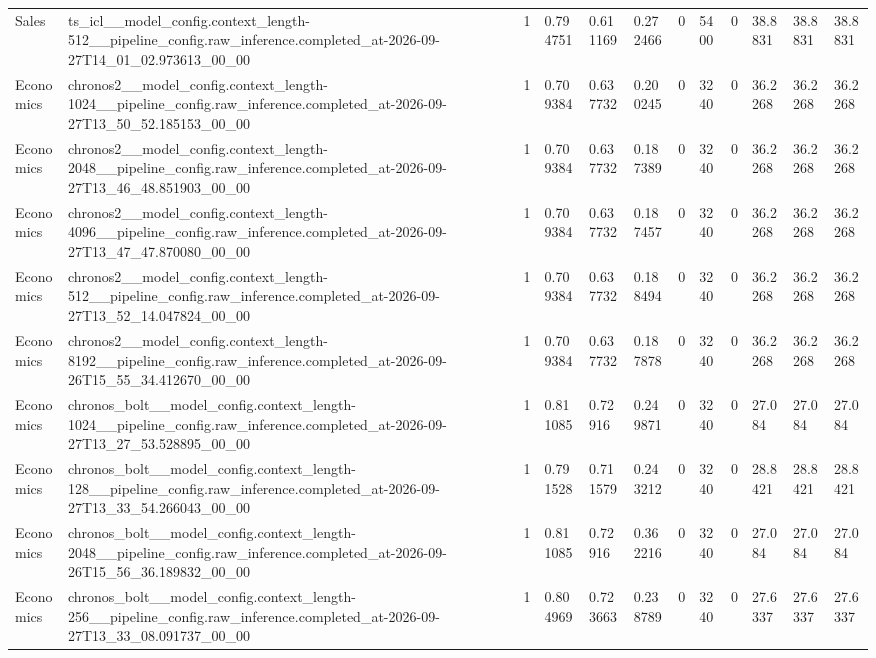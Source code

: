 \begin{tabular}{llllllllllll}
Sales & ts\_icl\_\_model\_config.context\_length-512\_\_pipeline\_config.raw\_inference.completed\_at-2026-09-27T14\_01\_02.973613\_00\_00 & 1 & 0.794751 & 0.611169 & 0.272466 & 0 & 5400 & 0 & 38.8831 & 38.8831 & 38.8831 \\
Economics & chronos2\_\_model\_config.context\_length-1024\_\_pipeline\_config.raw\_inference.completed\_at-2026-09-27T13\_50\_52.185153\_00\_00 & 1 & 0.709384 & 0.637732 & 0.200245 & 0 & 3240 & 0 & 36.2268 & 36.2268 & 36.2268 \\
Economics & chronos2\_\_model\_config.context\_length-2048\_\_pipeline\_config.raw\_inference.completed\_at-2026-09-27T13\_46\_48.851903\_00\_00 & 1 & 0.709384 & 0.637732 & 0.187389 & 0 & 3240 & 0 & 36.2268 & 36.2268 & 36.2268 \\
Economics & chronos2\_\_model\_config.context\_length-4096\_\_pipeline\_config.raw\_inference.completed\_at-2026-09-27T13\_47\_47.870080\_00\_00 & 1 & 0.709384 & 0.637732 & 0.187457 & 0 & 3240 & 0 & 36.2268 & 36.2268 & 36.2268 \\
Economics & chronos2\_\_model\_config.context\_length-512\_\_pipeline\_config.raw\_inference.completed\_at-2026-09-27T13\_52\_14.047824\_00\_00 & 1 & 0.709384 & 0.637732 & 0.188494 & 0 & 3240 & 0 & 36.2268 & 36.2268 & 36.2268 \\
Economics & chronos2\_\_model\_config.context\_length-8192\_\_pipeline\_config.raw\_inference.completed\_at-2026-09-26T15\_55\_34.412670\_00\_00 & 1 & 0.709384 & 0.637732 & 0.187878 & 0 & 3240 & 0 & 36.2268 & 36.2268 & 36.2268 \\
Economics & chronos\_bolt\_\_model\_config.context\_length-1024\_\_pipeline\_config.raw\_inference.completed\_at-2026-09-27T13\_27\_53.528895\_00\_00 & 1 & 0.811085 & 0.72916 & 0.249871 & 0 & 3240 & 0 & 27.084 & 27.084 & 27.084 \\
Economics & chronos\_bolt\_\_model\_config.context\_length-128\_\_pipeline\_config.raw\_inference.completed\_at-2026-09-27T13\_33\_54.266043\_00\_00 & 1 & 0.791528 & 0.711579 & 0.243212 & 0 & 3240 & 0 & 28.8421 & 28.8421 & 28.8421 \\
Economics & chronos\_bolt\_\_model\_config.context\_length-2048\_\_pipeline\_config.raw\_inference.completed\_at-2026-09-26T15\_56\_36.189832\_00\_00 & 1 & 0.811085 & 0.72916 & 0.362216 & 0 & 3240 & 0 & 27.084 & 27.084 & 27.084 \\
Economics & chronos\_bolt\_\_model\_config.context\_length-256\_\_pipeline\_config.raw\_inference.completed\_at-2026-09-27T13\_33\_08.091737\_00\_00 & 1 & 0.804969 & 0.723663 & 0.238789 & 0 & 3240 & 0 & 27.6337 & 27.6337 & 27.6337 \\

\end{tabular}
